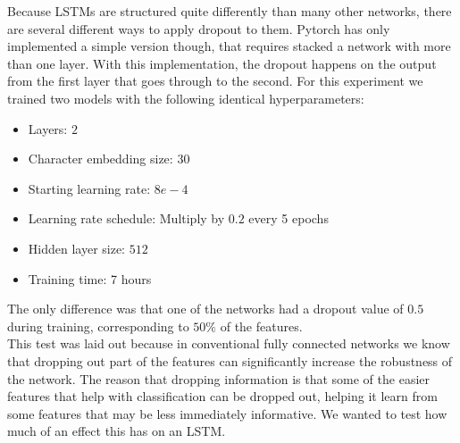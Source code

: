 Because LSTMs are structured quite differently than many other networks, there are several different ways to apply dropout to them.\cite{dropout} Pytorch has only implemented a simple version though, that requires stacked a network with more than one layer. With this implementation, the dropout happens on the output from the first layer that goes through to the second. For this experiment we trained two models with the following identical hyperparameters:
\begin{itemize}
	\item Layers: $2$
	\item Character embedding size: 30
	\item Starting learning rate: $8e-4$
	\item Learning rate schedule: Multiply by $0.2$ every 5 epochs
	\item Hidden layer size: $512$
	\item Training time: 7 hours
\end{itemize}
The only difference was that one of the networks had a dropout value of $0.5$ during training, corresponding to $50\%$ of the features.\\

\noindent
This test was laid out because in conventional fully connected networks we know that dropping out part of the features can significantly increase the robustness of the network. The reason that dropping information is that some of the easier features that help with classification can be dropped out, helping it learn from some features that may be less immediately informative. We wanted to test how much of an effect this has on an LSTM.

%

